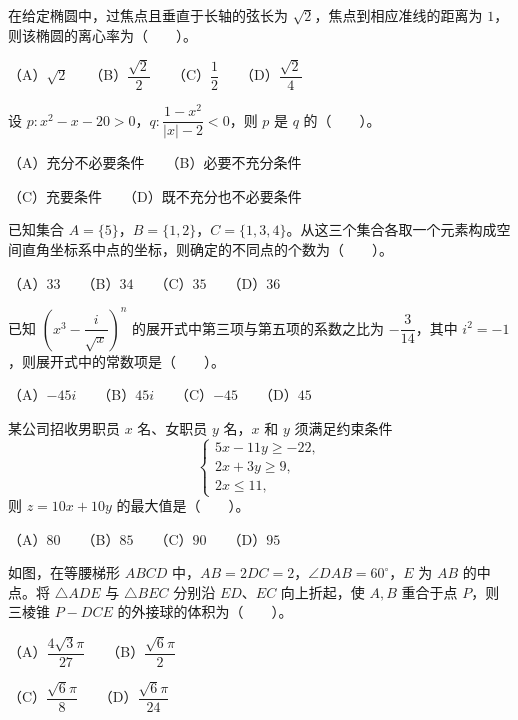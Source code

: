 \begin{question}
在给定椭圆中，过焦点且垂直于长轴的弦长为 $\sqrt2$，焦点到相应准线的距离为 $1$，则该椭圆的离心率为\mbox{（　　）}。

（A）$\sqrt2$　　（B）$\dfrac{\sqrt2}{2}$　　（C）$\dfrac12$　　（D）$\dfrac{\sqrt2}{4}$

\end{question}
\begin{question}
设 $p\colon x^2-x-20>0$，$q\colon\dfrac{1-x^2}{|x|-2}<0$，则 $p$ 是 $q$ 的\mbox{（　　）}。

（A）充分不必要条件　　（B）必要不充分条件

（C）充要条件　　（D）既不充分也不必要条件

\end{question}
\begin{question}
已知集合 $A=\{5\}$，$B=\{1,2\}$，$C=\{1,3,4\}$。从这三个集合各取一个元素构成空间直角坐标系中点的坐标，则确定的不同点的个数为\mbox{（　　）}。

（A）$33$　　（B）$34$　　（C）$35$　　（D）$36$

\end{question}
\begin{question}
已知 $\left(x^3-\dfrac{i}{\sqrt{x}}\right)^n$ 的展开式中第三项与第五项的系数之比为 $-\dfrac3{14}$，其中 $i^2=-1$，则展开式中的常数项是\mbox{（　　）}。

（A）$-45i$　　（B）$45i$　　（C）$-45$　　（D）$45$

\end{question}
\begin{question}
某公司招收男职员 $x$ 名、女职员 $y$ 名，$x$ 和 $y$ 须满足约束条件
\nopagebreak[4]
\[
\begin{cases}
5x-11y\ge -22,\\
2x+3y\ge 9,\\
2x\le 11,
\end{cases}
\]
则 $z=10x+10y$ 的最大值是\mbox{（　　）}。

（A）$80$　　（B）$85$　　（C）$90$　　（D）$95$

\Needspace{0.4\textheight}
\end{question}
\begin{question}
如图，在等腰梯形 $ABCD$ 中，$AB=2DC=2$，$\angle DAB=60^\circ$，$E$ 为 $AB$ 的中点。将 $\triangle ADE$ 与 $\triangle BEC$ 分别沿 $ED$、$EC$ 向上折起，使 $A,B$ 重合于点 $P$，则三棱锥 $P-DCE$ 的外接球的体积为\mbox{（　　）}。

（A）$\dfrac{4\sqrt3\pi}{27}$　　（B）$\dfrac{\sqrt6\pi}{2}$

（C）$\dfrac{\sqrt6\pi}{8}$　　（D）$\dfrac{\sqrt6\pi}{24}$
\nopagebreak[4]
\begin{center}\end{center}
\nopagebreak[4]
\end{question}

